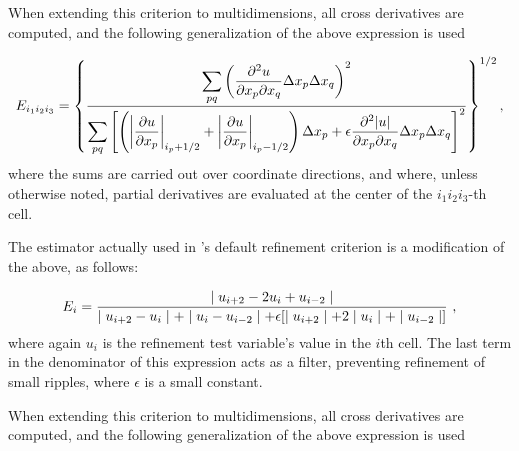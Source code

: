 When extending this criterion to
multidimensions, all cross derivatives are computed, and the
following generalization of the above expression is used

\begin{equation}
E_{i_1i_2i_3} = \left\{
            {\displaystyle
            \sum_{pq}\left({ \frac{\partial^2 u}{\partial x_p\partial x_q}}
                           \Delta x_p\Delta x_q\right)^2
            }
            \over
            {\displaystyle
            \sum_{pq}\left[\left(
                         \left|{\partial u\over\partial x_p}\right|_{i_p+1/2}
                         + \left|{\partial u\over\partial x_p}\right|_{i_p-1/2}
                           \right)\Delta x_p
                           + \epsilon{\partial^2 |u|\over
                           \partial x_p\partial x_q}
                           \Delta x_p\Delta x_q
                     \right]^2
            }
          \right\}^{1/2},
\end{equation}
where the sums are carried out over coordinate directions, and where,
unless otherwise noted, partial
derivatives are evaluated at the center of the $i_1i_2i_3$-th cell.

The estimator actually used in \flashx's default refinement criterion is
a modification of the above, as follows:

\begin{equation}
E_{i} = { \mid u_{i+2} - 2u_{i} + u_{i-2} \mid
          \over
          \mid u_{i+2} - u_{i} \mid + \mid u_{i} - u_{i-2} \mid +
              \epsilon [ \mid u_{i+2} \mid + 2 \mid  u_{i} \mid +
                          \mid u_{i-2} \mid ] }\ ,
\end{equation}
where again $u_i$ is the refinement test variable's value in the $i$th
cell. The last term in the denominator of this expression acts as a
filter, preventing refinement of small ripples, where $\epsilon$
is a small constant.

When extending this criterion to
multidimensions, all cross derivatives are computed, and the
following generalization of the above expression is used

